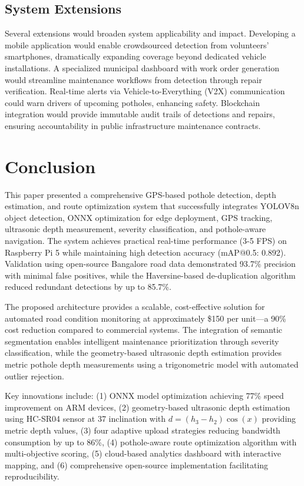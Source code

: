 \documentclass{ieeeaccess}
\begin{document}
\subsection{System Extensions}
Several extensions would broaden system applicability and impact. Developing a mobile application would enable crowdsourced detection from volunteers' smartphones, dramatically expanding coverage beyond dedicated vehicle installations. A specialized municipal dashboard with work order generation would streamline maintenance workflows from detection through repair verification. Real-time alerts via Vehicle-to-Everything (V2X) communication could warn drivers of upcoming potholes, enhancing safety. Blockchain integration would provide immutable audit trails of detections and repairs, ensuring accountability in public infrastructure maintenance contracts.

\section{Conclusion}

This paper presented a comprehensive GPS-based pothole detection, depth estimation, and route optimization system that successfully integrates YOLOV8n object detection, ONNX optimization for edge deployment, GPS tracking, ultrasonic depth measurement, severity classification, and pothole-aware navigation. The system achieves practical real-time performance (3-5 FPS) on Raspberry Pi 5 while maintaining high detection accuracy (mAP@0.5: 0.892). Validation using open-source Bangalore road data demonstrated 93.7\% precision with minimal false positives, while the Haversine-based de-duplication algorithm reduced redundant detections by up to 85.7\%.

The proposed architecture provides a scalable, cost-effective solution for automated road condition monitoring at approximately \$150 per unit---a 90\% cost reduction compared to commercial systems. The integration of semantic segmentation enables intelligent maintenance prioritization through severity classification, while the geometry-based ultrasonic depth estimation provides metric pothole depth measurements using a trigonometric model with automated outlier rejection.

Key innovations include: (1) ONNX model optimization achieving 77\% speed improvement on ARM devices, (2) geometry-based ultrasonic depth estimation using HC-SR04 sensor at 37\textdegree{} inclination with $d = (h_3 - h_2)\cos(x)$ providing metric depth values, (3) four adaptive upload strategies reducing bandwidth consumption by up to 86\%, (4) pothole-aware route optimization algorithm with multi-objective scoring, (5) cloud-based analytics dashboard with interactive mapping, and (6) comprehensive open-source implementation facilitating reproducibility.
\end{document}
